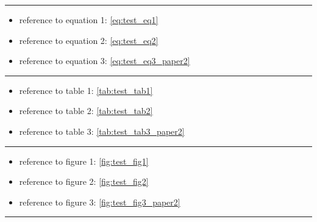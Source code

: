 %
\hrule
\begin{itemize}
	\item reference to equation 1: \eqref{eq:test_eq1}
	\item reference to equation 2: \eqref{eq:test_eq2}
	\item reference to equation 3: \eqref{eq:test_eq3_paper2}
\end{itemize}
\hrule
\begin{itemize}
	\item reference to table 1: \eqref{tab:test_tab1}
	\item reference to table 2: \eqref{tab:test_tab2}
	\item reference to table 3: \eqref{tab:test_tab3_paper2}
\end{itemize}
\hrule
\begin{itemize}
	\item reference to figure 1: \eqref{fig:test_fig1}
	\item reference to figure 2: \eqref{fig:test_fig2}
	\item reference to figure 3: \eqref{fig:test_fig3_paper2}
\end{itemize}
\hrule




%
%
%
